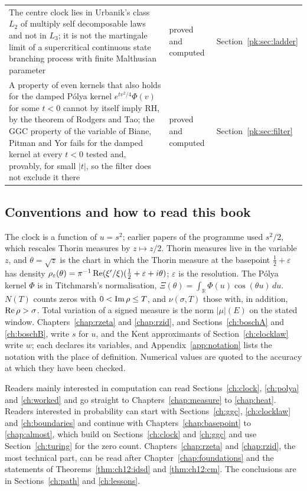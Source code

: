 {\begin{longtable}{p{}p{}p{}}
The centre clock lies in Urbanik's class $L_2$ of multiply self decomposable laws and not in $L_3$; it is not the martingale limit of a supercritical continuous state branching process with finite Malthusian parameter & \raggedright proved and computed & Section~\ref{pk:sec:ladder}\\
A property of even kernels that also holds for the damped P\'olya kernel $e^{tv^2/4}\Phi(v)$ for some $t<0$ cannot by itself imply RH, by the theorem of Rodgers and Tao; the GGC property of the variable of Biane, Pitman and Yor fails for the damped kernel at every $t<0$ tested and, provably, for small $|t|$, so the filter does not exclude it there & \raggedright proved and computed & Section~\ref{pk:sec:filter}\\
\end{longtable}}

\subsection{Conventions and how to read this book}

The clock is a function of $u=s^2$; earlier papers of the programme used $s^2/2$, which rescales Thorin measures by $z\mapsto z/2$. Thorin measures live in the variable $z$, and $\theta=\sqrt z$ is the chart in which the Thorin measure at the basepoint $\frac12+\varepsilon$ has density $\rho_\varepsilon(\theta)=\pi^{-1}\operatorname{Re}(\xi'/\xi)(\frac12+\varepsilon+i\theta)$; $\varepsilon$ is the resolution. The P\'olya kernel $\Phi$ is in Titchmarsh's normalisation, $\Xi(\theta)=\int_{\mathbb R}\Phi(u)\cos(\theta u)\,du$. $N(T)$ counts zeros with $0<\operatorname{Im}\rho\le T$, and $\nu(\sigma,T)$ those with, in addition, $\operatorname{Re}\rho>\sigma$. Total variation of a signed measure is the norm $|\mu|(E)$ on the stated window. Chapters~\ref{chap:rzeta} and \ref{chap:rzid}, and Sections~\ref{ch:boschA} and \ref{ch:boschB}, write $s$ for $u$, and the Kent approximants of Section~\ref{ch:clocklaw} write $w$; each declares its variables, and Appendix~\ref{app:notation} lists the notation with the place of definition. Numerical values are quoted to the accuracy at which they have been checked.

Readers mainly interested in computation can read Sections~\ref{ch:clock}, \ref{ch:polya} and \ref{ch:worked} and go straight to Chapters~\ref{chap:measure} to \ref{chap:heat}. Readers interested in probability can start with Sections~\ref{ch:ggc}, \ref{ch:clocklaw} and \ref{ch:boundaries} and continue with Chapters~\ref{chap:basepoint} to \ref{chap:almost}, which build on Sections~\ref{ch:clock} and \ref{ch:ggc} and use Section~\ref{ch:turing} for the zero count. Chapters~\ref{chap:rzeta} and \ref{chap:rzid}, the most technical part, can be read after Chapter~\ref{chap:foundations} and the statements of Theorems~\ref{thm:ch12:idsd} and \ref{thm:ch12:cm}. The conclusions are in Sections~\ref{ch:path} and \ref{ch:lessons}.
